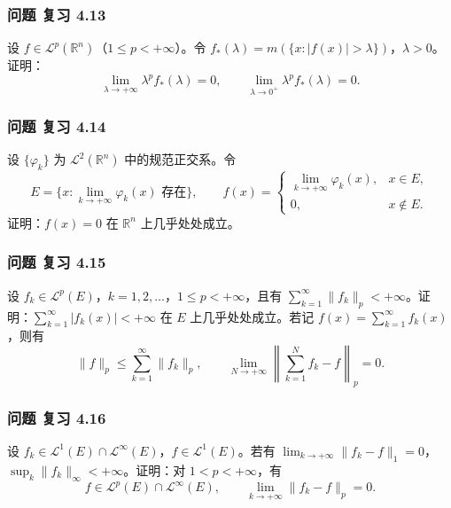 \documentclass[11pt,a4paper]{article}
\begin{document}
\subsubsection{问题 复习 4.13}\label{ch04-practice-ux95eeux9898-ux590dux4e60-4.13}

设 \(f\in\mathcal L^p(\mathbb R^n)\)（\(1\le p<+\infty\)）。令
\(f_*(\lambda)=m(\{x:|f(x)|>\lambda\})\)，\(\lambda>0\)。证明： \[
\lim_{\lambda\to+\infty}\lambda^pf_*(\lambda)=0,\qquad
\lim_{\lambda\to0^+}\lambda^pf_*(\lambda)=0.
\]

\subsubsection{问题 复习 4.14}\label{ch04-practice-ux95eeux9898-ux590dux4e60-4.14}

设 \(\{\varphi_k\}\) 为 \(\mathcal L^2(\mathbb R^n)\) 中的规范正交系。令
\[
E=\{x:\lim_{k\to+\infty}\varphi_k(x)\text{ 存在}\},\qquad
f(x)=\begin{cases}\lim_{k\to+\infty}\varphi_k(x),&x\in E,\\0,&x\notin E.\end{cases}
\] 证明：\(f(x)=0\) 在 \(\mathbb R^n\) 上几乎处处成立。

\subsubsection{问题 复习 4.15}\label{ch04-practice-ux95eeux9898-ux590dux4e60-4.15}

设 \(f_k\in\mathcal L^p(E)\)，\(k=1,2,\ldots\)，\(1\le p<+\infty\)，且有
\(\sum_{k=1}^\infty\|f_k\|_p<+\infty\)。证明：\(\sum_{k=1}^\infty|f_k(x)|<+\infty\)
在 \(E\) 上几乎处处成立。若记 \(f(x)=\sum_{k=1}^\infty f_k(x)\)，则有 \[
\|f\|_p\le\sum_{k=1}^\infty\|f_k\|_p,\qquad
\lim_{N\to+\infty}\left\|\sum_{k=1}^Nf_k-f\right\|_p=0.
\]

\subsubsection{问题 复习 4.16}\label{ch04-practice-ux95eeux9898-ux590dux4e60-4.16}

设
\(f_k\in\mathcal L^1(E)\cap\mathcal L^\infty(E)\)，\(f\in\mathcal L^1(E)\)。若有
\(\lim_{k\to+\infty}\|f_k-f\|_1=0\)，\(\sup_k\|f_k\|_\infty<+\infty\)。证明：对
\(1<p<+\infty\)，有 \[
f\in\mathcal L^p(E)\cap\mathcal L^\infty(E),\qquad
\lim_{k\to+\infty}\|f_k-f\|_p=0.
\]
\end{document}
